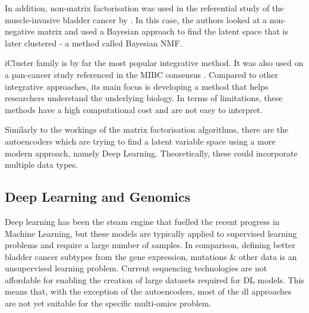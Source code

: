 In addition, non-matrix factorisation was used in the referential study of the muscle-invasive bladder cancer by \citet{Robertson2017-mg}. In this case, the authors looked at a non-negative matrix and used a Bayesian approach to find the latent space that is later clustered - a method called Bayesian NMF.

iCluster family is by far the most popular integrative method. It was also used on a pan-cancer \citep{Hoadley2018-qe} study referenced in the MIBC consensus \citep{Kamoun2020-tj}. Compared to other integrative approaches, its main focus is developing a method that helps researchers understand the underlying biology. In terms of limitations, these methods have a high computational cost and are not easy to interpret.

Similarly to the workings of the matrix factorisation algorithms, there are the autoencoders which are trying to find a latent variable space using a more modern approach, namely Deep Learning. Theoretically, these could incorporate multiple data types.

\subsection{Deep Learning  and Genomics} \label{s:lit:dl_genomics}

\vspace{3mm}
\vspace{3mm}

Deep learning has been the steam engine that fuelled the recent progress in Machine Learning, but these models are typically applied to supervised learning problems and require a large number of samples. In comparison, defining better bladder cancer subtypes from the gene expression, mutations \& other data is an unsupervised learning problem. Current sequencing technologies are not affordable for enabling the creation of large datasets required for DL models. This means that, with the exception of the autoencoders, most of the \acrshort{dl} approaches are not yet suitable for the specific multi-omics problem.

